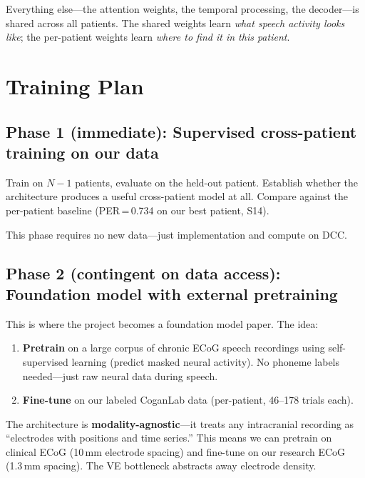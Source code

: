 \documentclass[11pt,letterpaper]{article}
\begin{document}
Everything else---the attention weights, the temporal processing, the decoder---is shared across all patients. The shared weights learn \textit{what speech activity looks like}; the per-patient weights learn \textit{where to find it in this patient}.


\section{Training Plan}

\subsection*{Phase 1 (immediate): Supervised cross-patient training on our data}

Train on $N{-}1$ patients, evaluate on the held-out patient. Establish whether the architecture produces a useful cross-patient model at all. Compare against the per-patient baseline (PER\,=\,0.734 on our best patient, S14).

This phase requires no new data---just implementation and compute on DCC.

\subsection*{Phase 2 (contingent on data access): Foundation model with external pretraining}

This is where the project becomes a foundation model paper. The idea:

\begin{enumerate}[leftmargin=2em]
    \item \textbf{Pretrain} on a large corpus of chronic ECoG speech recordings using self-supervised learning (predict masked neural activity). No phoneme labels needed---just raw neural data during speech.
    \item \textbf{Fine-tune} on our labeled CoganLab data (per-patient, 46--178 trials each).
\end{enumerate}

The architecture is \textbf{modality-agnostic}---it treats any intracranial recording as ``electrodes with positions and time series.'' This means we can pretrain on clinical ECoG (10\,mm electrode spacing) and fine-tune on our research \textmu ECoG (1.3\,mm spacing). The VE bottleneck abstracts away electrode density.
\end{document}
